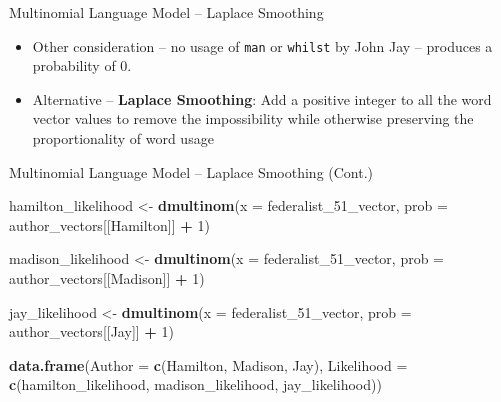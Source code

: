 \documentclass[
  ignorenonframetext,
  aspectratio=169]{beamer}
\newenvironment{Shaded}{\begin{snugshade}}{\end{snugshade}}
\newcommand{\AttributeTok}[1]{\textcolor[rgb]{0.13,0.29,0.53}{#1}}
\newcommand{\DecValTok}[1]{\textcolor[rgb]{0.00,0.00,0.81}{#1}}
\newcommand{\FunctionTok}[1]{\textcolor[rgb]{0.13,0.29,0.53}{\textbf{#1}}}
\newcommand{\NormalTok}[1]{#1}
\newcommand{\OtherTok}[1]{\textcolor[rgb]{0.56,0.35,0.01}{#1}}
\newcommand{\SpecialCharTok}[1]{\textcolor[rgb]{0.81,0.36,0.00}{\textbf{#1}}}
\newcommand{\StringTok}[1]{\textcolor[rgb]{0.31,0.60,0.02}{#1}}
\begin{document}
\begin{frame}{Multinomial Language Model -- Laplace Smoothing}
\label{multinomial-language-model-laplace-smoothing}
\begin{itemize}
\item Other consideration -- no usage of \texttt{man} or \texttt{whilst} by John Jay -- produces a probability of 0. \par \vspace{2.5mm} 
\item Alternative -- \textbf{Laplace Smoothing}: Add a positive integer to all the word vector values to remove the impossibility while otherwise preserving the proportionality of word usage 
\end{itemize}
\end{frame}

\begin{frame}[fragile]{Multinomial Language Model -- Laplace Smoothing
(Cont.)}
\label{multinomial-language-model-laplace-smoothing-cont.}
\scriptsize

\scriptsize

\begin{Shaded}
\begin{Highlighting}[]
\NormalTok{hamilton\_likelihood }\OtherTok{\textless{}{-}} \FunctionTok{dmultinom}\NormalTok{(}\AttributeTok{x =}\NormalTok{ federalist\_51\_vector, }\AttributeTok{prob =}\NormalTok{ author\_vectors[[}\StringTok{\textquotesingle{}Hamilton\textquotesingle{}}\NormalTok{]] }\SpecialCharTok{+} \DecValTok{1}\NormalTok{)}

\NormalTok{madison\_likelihood }\OtherTok{\textless{}{-}} \FunctionTok{dmultinom}\NormalTok{(}\AttributeTok{x =}\NormalTok{ federalist\_51\_vector, }\AttributeTok{prob =}\NormalTok{ author\_vectors[[}\StringTok{\textquotesingle{}Madison\textquotesingle{}}\NormalTok{]] }\SpecialCharTok{+} \DecValTok{1}\NormalTok{)}

\NormalTok{jay\_likelihood }\OtherTok{\textless{}{-}} \FunctionTok{dmultinom}\NormalTok{(}\AttributeTok{x =}\NormalTok{ federalist\_51\_vector, }\AttributeTok{prob =}\NormalTok{ author\_vectors[[}\StringTok{\textquotesingle{}Jay\textquotesingle{}}\NormalTok{]] }\SpecialCharTok{+} \DecValTok{1}\NormalTok{)}


\FunctionTok{data.frame}\NormalTok{(}\AttributeTok{Author =} \FunctionTok{c}\NormalTok{(}\StringTok{\textquotesingle{}Hamilton\textquotesingle{}}\NormalTok{, }\StringTok{\textquotesingle{}Madison\textquotesingle{}}\NormalTok{, }\StringTok{\textquotesingle{}Jay\textquotesingle{}}\NormalTok{), }
           \AttributeTok{Likelihood =} \FunctionTok{c}\NormalTok{(hamilton\_likelihood, madison\_likelihood, jay\_likelihood))}
\end{Highlighting}
\end{Shaded}


\end{frame}
\end{document}
